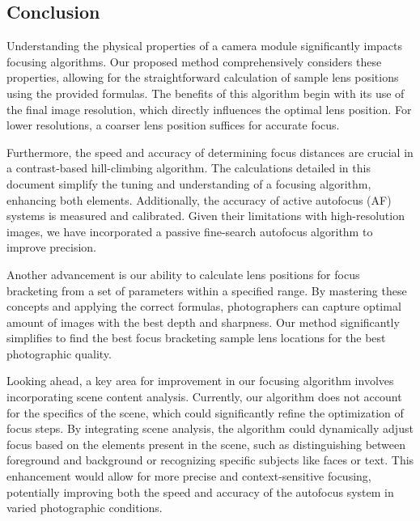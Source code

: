 \documentclass{article}
\begin{document}
\subsection{Conclusion}
\label{sec:conclusion}

Understanding the physical properties of a camera module significantly impacts focusing algorithms. Our proposed method comprehensively considers these properties, allowing for the straightforward calculation of sample lens positions using the provided formulas. The benefits of this algorithm begin with its use of the final image resolution, which directly influences the optimal lens position. For lower resolutions, a coarser lens position suffices for accurate focus.

Furthermore, the speed and accuracy of determining focus distances are crucial in a contrast-based hill-climbing algorithm. The calculations detailed in this document simplify the tuning and understanding of a focusing algorithm, enhancing both elements. Additionally, the accuracy of active autofocus (AF) systems is measured and calibrated. Given their limitations with high-resolution images, we have incorporated a passive fine-search autofocus algorithm to improve precision.

Another advancement is our ability to calculate lens positions for focus bracketing from a set of parameters within a specified range. By mastering these concepts and applying the correct formulas, photographers can capture optimal amount of images with the best depth and sharpness. Our method significantly simplifies to find the best focus bracketing sample lens locations for the best photographic quality.

Looking ahead, a key area for improvement in our focusing algorithm involves incorporating scene content analysis. Currently, our algorithm does not account for the specifics of the scene, which could significantly refine the optimization of focus steps. By integrating scene analysis, the algorithm could dynamically adjust focus based on the elements present in the scene, such as distinguishing between foreground and background or recognizing specific subjects like faces or text. This enhancement would allow for more precise and context-sensitive focusing, potentially improving both the speed and accuracy of the autofocus system in varied photographic conditions.

\end{document}
